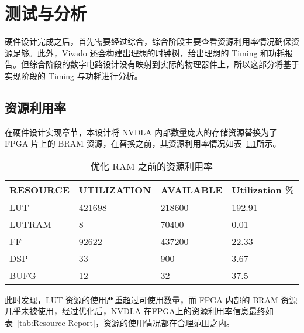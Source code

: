 \chapter{测试与分析}\label{chap:result}

硬件设计完成之后，首先需要经过综合，综合阶段主要查看资源利用率情况确保资源足够。此外，Vivado 还会构建出理想的时钟树，给出理想的 Timing 和功耗报告。但综合阶段的数字电路设计没有映射到实际的物理器件上，所以这部分将基于实现阶段的 Timing 与功耗进行分析。

\section{资源利用率}

在硬件设计实现章节，本设计将 NVDLA 内部数量庞大的存储资源替换为了 FPGA 片上的 BRAM 资源，在替换之前，其资源利用率情况如表~\ref{tab:Resource Report Before}所示。

\begin{table}[!htbp]
    \caption{优化 RAM 之前的资源利用率}
    \label{tab:Resource Report Before}
    \centering
    \footnotesize%
    \setlength{\tabcolsep}{4pt}%
    \renewcommand{\arraystretch}{1.2}%
    \begin{tabular}{llll}
        \toprule
        \textbf{RESOURCE} & \textbf{UTILIZATION} & \textbf{AVAILABLE} & \textbf{Utilization \%} \\
        \midrule
        LUT               & 421698               & 218600               & 192.91                  \\
        LUTRAM            & 8                    & 70400                & 0.01                    \\
        FF                & 92622                & 437200               & 22.33                   \\
        DSP               & 33                   & 900                  & 3.67                    \\
        BUFG              & 12                   & 32                   & 37.5                    \\
        \bottomrule                   
    \end{tabular}
\end{table}

此时发现，LUT 资源的使用严重超过可使用数量，而 FPGA 内部的 BRAM 资源几乎未被使用，经过优化后，NVDLA 在FPGA上的资源利用率信息最终如表~\ref{tab:Resource Report}，资源的使用情况都在合理范围之内。

